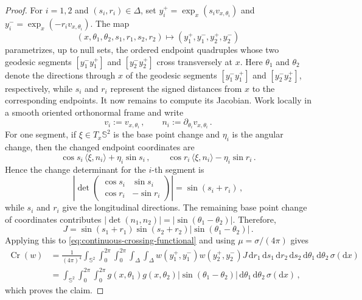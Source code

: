 \documentclass[reqno, 11pt]{amsart}
\theoremstyle{definition}
\newcommand{\abs}[1]{\left\lvert#1\right\rvert}
\newcommand{\dd}{\mathrm{d}}
\begin{document}
\begin{proof}
For \(i=1,2\) and $(s_i,r_i)\in\Delta $, set $ y_i^+=\exp_x(s_i v_{x,\theta_i})$ and $y_i^-=\exp_x(-r_i v_{x,\theta_i})$. The map
\[
        (x,\theta_1,\theta_2,s_1,r_1,s_2,r_2)
        \longmapsto (y_1^+,y_1^-,y_2^+,y_2^-)
\]
parametrizes, up to null sets, the ordered endpoint quadruples whose two geodesic segments $[y_1^-y_1^+]$ and $[y_2^-y_2^+]$ cross transversely at \(x\). Here \(\theta_1\) and \(\theta_2\) denote the directions through \(x\) of the geodesic segments \([y_1^-y_1^+]\) and \([y_2^-y_2^+]\), respectively, while \(s_i\) and \(r_i\) represent the signed distances from \(x\) to the corresponding endpoints. It now remains to compute its Jacobian. Work locally in a smooth oriented orthonormal frame and write
\[
        v_i:=v_{x,\theta_i}\,,\qquad n_i:=\partial_{\theta_i}v_{x,\theta_i}\,.
\]
For one segment, if \(\xi\in T_x{\mathbb S}^2\) is the base point change and \(\eta_i\) is the angular change, then the changed endpoint coordinates are
\[
        \cos s_i\,\langle\xi,n_i\rangle+\eta_i\sin s_i\,,
        \qquad
        \cos r_i\,\langle\xi,n_i\rangle-\eta_i\sin r_i\,.
\]
Hence the change determinant for the \(i\)-th segment is
\[
        \abs{\det\begin{pmatrix}
        \cos s_i & \sin s_i\\
        \cos r_i & -\sin r_i
        \end{pmatrix}}
        =\sin(s_i+r_i)\,,
\]
while \(s_i\) and \(r_i\) give the longitudinal directions.  The remaining base point change of coordinates contributes $\abs{\det(n_1,n_2)}=\abs{\sin(\theta_1-\theta_2)}.$ Therefore,
\begin{equation}\label{eq:spherical-crossing-jacobian-main}
        J=
        \sin(s_1+r_1)\sin(s_2+r_2)
        \abs{\sin(\theta_1-\theta_2)}\,.
\end{equation}
Applying this to \eqref{eq:continuous-crossing-functional} and using \(\mu=\sigma/(4\pi)\) gives
\begin{align*}
        \operatorname{Cr}(w)
        &=\frac{1}{(4\pi)^{4}}
        \int_{{\mathbb S}^2}\int_0^{2\pi}\int_0^{2\pi}
        \int_{\Delta}\int_{\Delta}
        w(y_1^+,y_1^-)w(y_2^+,y_2^-) J
        \,\dd r_1\,\dd s_1\,\dd r_2\,\dd s_2
        \,\dd\theta_1\,\dd\theta_2\,\sigma(\dd x) \\
        &=\int_{{\mathbb S}^2}\int_0^{2\pi}\int_0^{2\pi}
        g(x,\theta_1)g(x,\theta_2)
        \abs{\sin(\theta_1-\theta_2)}
        \,\dd\theta_1\,\dd\theta_2\,\sigma(\dd x)\,,
\end{align*}
which proves the claim.
\end{proof}
\end{document}
